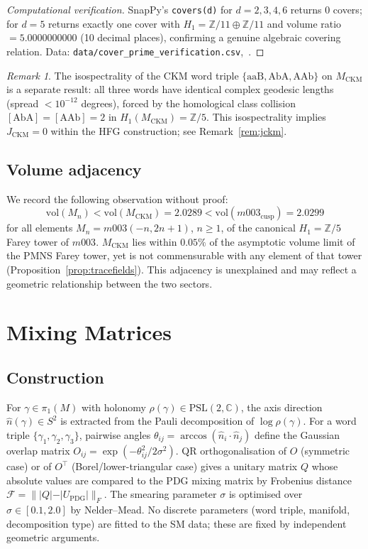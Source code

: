 \documentclass[11pt,a4paper]{article}
\theoremstyle{definition}
\theoremstyle{remark}
\newtheorem{remark}[theorem]{Remark}
\newcommand{\PSL}{\mathrm{PSL}(2,\mathbb{C})}
\newcommand{\ZZ}{\mathbb{Z}}
\newcommand{\MCKM}{M_{\mathrm{CKM}}}
\begin{document}
\begin{proof}[Computational verification]
SnapPy's \texttt{covers(d)} for $d=2,3,4,6$ returns 0 covers;
for $d=5$ returns exactly one cover with
$H_1 = \ZZ/11\oplus\ZZ/11$ and
volume ratio $= 5.0000000000$ (10 decimal places),
confirming a genuine algebraic covering relation.
Data: \texttt{data/cover\_prime\_verification.csv},~\cite{GitHub}.
\end{proof}

\begin{remark}
\label{rem:isospectral}
The isospectrality of the CKM word triple
$\{\mathrm{aaB},\mathrm{AbA},\mathrm{AAb}\}$ on $\MCKM$
is a separate result: all three words have identical complex
geodesic lengths (spread $< 10^{-12}$ degrees),
forced by the homological class collision
$[\mathrm{AbA}]=[\mathrm{AAb}]=2$ in $H_1(\MCKM)=\ZZ/5$.
This isospectrality implies $J_\mathrm{CKM}=0$ within the
HFG construction; see Remark~\ref{rem:jckm}.
\end{remark}

\subsection{Volume adjacency}

We record the following observation without proof:
\[
  \mathrm{vol}(M_n) < \mathrm{vol}(\MCKM) = 2.0289
  < \mathrm{vol}(m003_\mathrm{cusp}) = 2.0299
\]
for all elements $M_n = m003(-n,2n+1)$, $n\geq1$, of the
canonical $H_1=\ZZ/5$ Farey tower of $m003$.
$\MCKM$ lies within $0.05\%$ of the asymptotic volume limit
of the PMNS Farey tower, yet is not commensurable with any
element of that tower (Proposition~\ref{prop:tracefields}).
This adjacency is unexplained and may reflect a geometric
relationship between the two sectors.

\section{Mixing Matrices}
\label{sec:mixing}

\subsection{Construction}

For $\gamma\in\pi_1(M)$ with holonomy $\rho(\gamma)\in\PSL$,
the axis direction $\hat{n}(\gamma)\in S^2$ is extracted from
the Pauli decomposition of $\log\rho(\gamma)$.
For a word triple $\{\gamma_1,\gamma_2,\gamma_3\}$,
pairwise angles $\theta_{ij} = \arccos(\hat{n}_i\cdot\hat{n}_j)$
define the Gaussian overlap matrix
$O_{ij} = \exp(-\theta_{ij}^2/2\sigma^2)$.
QR orthogonalisation of $O$ (symmetric case) or of
$O^\intercal$ (Borel/lower-triangular case) gives a unitary
matrix $Q$ whose absolute values are compared to the
PDG mixing matrix by Frobenius distance
$\mathcal{F} = \|{|}Q|-|U_{\mathrm{PDG}}|\|_F$.
The smearing parameter $\sigma$ is optimised over
$\sigma\in[0.1,2.0]$ by Nelder--Mead.
No discrete parameters (word triple, manifold, decomposition
type) are fitted to the SM data; these are fixed by
independent geometric arguments.
\end{document}
